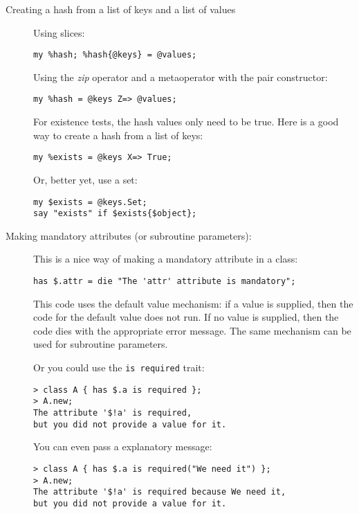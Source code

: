 \begin{description}
\item[Creating a hash from a list of keys and a list of values] Using slices:

\begin{verbatim}
my %hash; %hash{@keys} = @values;
\end{verbatim}

Using the \emph{zip} operator and a metaoperator with the pair constructor:

\begin{verbatim}
my %hash = @keys Z=> @values;
\end{verbatim}

For existence tests, the hash values only need to be true. Here is 
a good way to create a hash from a list of keys:
\begin{verbatim}
my %exists = @keys X=> True;
\end{verbatim}

Or, better yet, use a set:
\begin{verbatim}
my $exists = @keys.Set;
say "exists" if $exists{$object};
\end{verbatim}

\item[Making mandatory attributes (or subroutine parameters):] 
This is a nice way of making a mandatory attribute in a class:
\begin{verbatim}
has $.attr = die "The 'attr' attribute is mandatory";
\end{verbatim}
This code uses the default value mechanism: if a value is supplied, 
then the code for the default value does not run. If no value is 
supplied, then the code dies with the appropriate error message. 
The same mechanism can be used for subroutine parameters.

Or you could use the \verb'is required' trait:

\begin{verbatim}
> class A { has $.a is required }; 
> A.new;
The attribute '$!a' is required, 
but you did not provide a value for it.
\end{verbatim}

You can even pass a explanatory message:

\begin{verbatim}
> class A { has $.a is required("We need it") }; 
> A.new;
The attribute '$!a' is required because We need it,
but you did not provide a value for it.
\end{verbatim}


\end{description}
